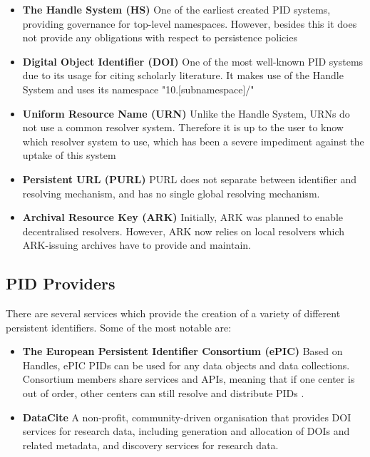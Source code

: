 \documentclass[conference]{IEEEtran}
\begin{document}
\begin{itemize}
    \item \textbf{The Handle System (HS)} One of the earliest created PID systems, providing governance for top-level namespaces. However, besides this it does not provide any obligations with respect to persistence policies
    \item \textbf{Digital Object Identifier (DOI)} One of the most well-known PID systems due to its usage for citing scholarly literature. It makes use of the Handle System and uses its namespace "10.[subnamespace]/"
    \item \textbf{Uniform Resource Name (URN)} Unlike the Handle System, URNs do not use a common resolver system. Therefore it is up to the user to know which resolver system to use, which has been a severe impediment against the uptake of this system
    \item \textbf{Persistent URL (PURL)} PURL does not separate between identifier and resolving mechanism, and has no single global resolving mechanism. 
    \item \textbf{Archival Resource Key (ARK)} Initially, ARK was planned to enable decentralised resolvers. However, ARK now relies on local resolvers which ARK-issuing archives have to provide and maintain.
\end{itemize}

\subsection{PID Providers}

There are several services which provide the creation of a variety of different persistent identifiers. Some of the most notable are:

\begin{itemize}
    \item \textbf{The European Persistent Identifier Consortium (ePIC)} Based on Handles, ePIC PIDs can be used for any data objects and data collections. Consortium members share services and APIs, meaning that if one center is out of order, other centers can still resolve and distribute PIDs \cite{workpackage6}.
    \item \textbf{DataCite} A non-profit, community-driven organisation that provides DOI services for research data, including generation and allocation of DOIs and related metadata, and discovery services for research data. 
\end{itemize}
\end{document}
